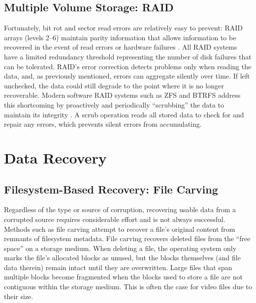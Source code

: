 \subsection{Multiple Volume Storage: RAID}

Fortunately, bit rot and sector read errors are relatively easy to prevent: RAID arrays (levels 2--6) maintain parity information that allows information to be recovered in the event of read errors or hardware failures \cite{chen1994}. All RAID systems have a limited redundancy threshold representing the number of disk failures that can be tolerated. RAID's error correction detects problems only when reading the data, and, as previously mentioned, errors can aggregate silently over time. If left unchecked, the data could still degrade to the point where it is no longer recoverable. Modern software RAID systems such as ZFS and BTRFS address this shortcoming by proactively and periodically ``scrubbing'' the data to maintain its integrity \cite{zfs} \cite{zfs-scrub} \cite{btrfs}. A scrub operation reads all stored data to check for and repair any errors, which prevents silent errors from accumulating.


\section{Data Recovery}

\subsection{Filesystem-Based Recovery: File Carving}

Regardless of the type or source of corruption, recovering usable data from a corrupted source requires considerable effort and is not always successful. Methods such as file carving \cite{pal2009} \cite{poisel2013} attempt to recover a file's original content from remnants of filesystem metadata. File carving recovers deleted files from the ``free space'' on a storage medium. When deleting a file, the operating system only marks the file's allocated blocks as unused, but the blocks themselves (and file data therein) remain intact until they are overwritten. Large files that span multiple blocks become fragmented when the blocks used to store a file are not contiguous within the storage medium. This is often the case for video files due to their size.

